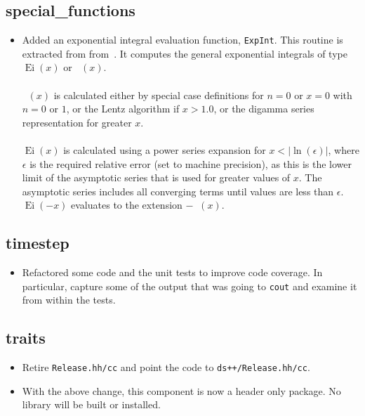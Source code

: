 \documentclass[note]{ResearchNote_pdf}
\newcommand{\Ei}{\mathop{\mathrm{Ei}}}
\newcommand{\En}[1]{\mathop{\mathrm{E}_{#1}}}
\begin{document}

\subsection{special\_functions}
\label{changes:special-functions}
\begin{itemize}

\item Added an exponential integral evaluation function,
  \texttt{ExpInt}. This routine is extracted from
  from~\cite{numericalrecipesforcpp}.  It computes the general
  exponential integrals of type $\Ei(x)$ or $\En{n}(x)$. \\
  \\
  $\En{n}(x)$ is calculated either by special case definitions for $n=0$
  or $x=0$ with $n=0$ or $1$, or the Lentz algorithm if $x>1.0$, or
  the digamma series representation for greater $x$. \\
  \\
  $\Ei(x)$ is calculated using a power series expansion for
  $x<|\ln(\epsilon)|$, where $\epsilon$ is the required relative error (set to
  machine precision), as this is the lower limit of the asymptotic
  series that is used for greater values of $x$. The asymptotic
  series includes all converging terms until values are less than
  $\epsilon$. $\Ei(-x)$ evaluates to the extension $-\En{1}(x)$.
\end{itemize}

\subsection{timestep}
\label{changes:timestep}
\begin{itemize}
\item Refactored some code and the unit tests to improve code
  coverage.  In particular, capture some of the output that was going
  to \texttt{cout} and examine it from within the tests.
\end{itemize}

\subsection{traits}
\label{changes:traits}
\begin{itemize}
\item Retire \texttt{Release.hh/cc} and point the code to
  \texttt{ds++/Release.hh/cc}.  
\item With the above change, this component is now a header only
  package.  No library will be built or installed.
\end{itemize}
\end{document}
